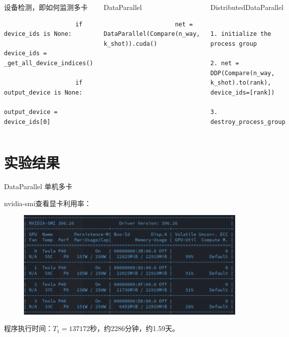 \documentclass[algorithm,pgfplots]{cuzbeamer}
\begin{document}
    \begin{fragile}[并行部分伪代码]
        \begin{columns}[T,onlytextwidth]
            \begin{block}{设备检测，即如何监测多卡}
                \begin{verbatim}
                    if device_ids is None:
                        device_ids = _get_all_device_indices()

                    if output_device is None:
                        output_device = device_ids[0]
                \end{verbatim}
            \end{block}
            \begin{block}{DataParallel}
                \begin{verbatim}
                    net = DataParallel(Compare(n_way, k_shot)).cuda()
                \end{verbatim}
            \end{block}
            \begin{block}{DistributedDataParallel}
                \begin{verbatim}
                    1. initialize the process group
                    2. net = DDP(Compare(n_way, k_shot).to(rank), device_ids=[rank])
                    3. destroy_process_group
                \end{verbatim}
            \end{block}
        \end{columns}
    \end{fragile}

    \section{实验结果}
    
    \begin{frame}{DataParallel 单机多卡}
        \begin{leftbar}
            {\ttfamily nvidia-smi}查看显卡利用率：
        \end{leftbar}
        \begin{figure}
            \includegraphics[scale=0.4]{figure/01gpu-use.png}
        \end{figure}
        程序执行时间：$T_1=137172$秒，约2286分钟，约1.59天。
    \end{frame}
\end{document}

